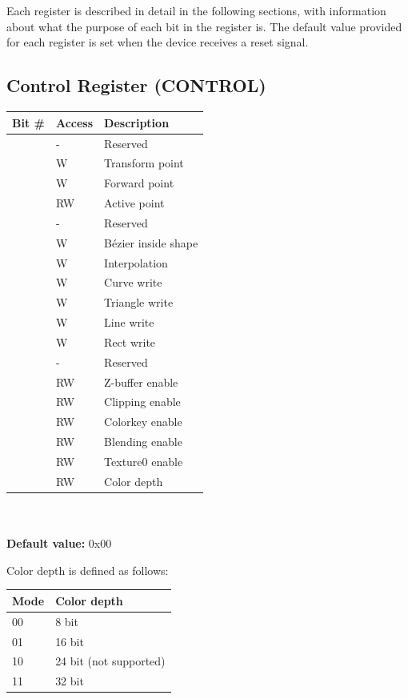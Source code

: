 \documentclass[10pt,a4paper]{article}
\begin{document}
\\\\
Each register is described in detail in the following sections, with information about what the purpose of each bit in the register is. The default value provided for each register is set when the device receives a reset signal.

\subsection{Control Register (CONTROL)}
\begin{tabular}{|l|l|l|}
\hline \textbf{Bit \#} & \textbf{Access} & \textbf{Description} \\ 
\hline
\hline [31:20] & -  & Reserved \\
\hline [19]    & W  & Transform point \\
\hline [18]    & W  & Forward point \\
\hline [17:16] & RW & Active point \\
\hline [15:14] & -  & Reserved \\
\hline [13]    & W  & B\'{e}zier inside shape \\
\hline [12]    & W  & Interpolation \\
\hline [11]    & W  & Curve write \\
\hline [10]    & W  & Triangle write \\
\hline [9]     & W  & Line write \\
\hline [8]     & W  & Rect write \\
\hline [7]     & -  & Reserved \\
\hline [6]     & RW & Z-buffer enable \\
\hline [5]     & RW & Clipping enable \\
\hline [4]     & RW & Colorkey enable \\
\hline [3]     & RW & Blending enable \\
\hline [2]     & RW & Texture0 enable \\
\hline [1:0]   & RW & Color depth \\
\hline 
\end{tabular}
\\\\
\textbf{Default value:} 0x00

Color depth is defined as follows:

\begin{tabular}{|l|l|}
\hline \textbf{Mode} & \textbf{Color depth}\\ 
\hline
\hline 00 & 8 bit \\
\hline 01 & 16 bit \\
\hline 10 & 24 bit (not supported) \\
\hline 11 & 32 bit \\
\hline 
\end{tabular} \\
\end{document}
